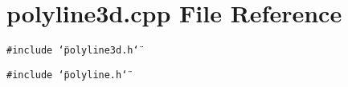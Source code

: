 \section{polyline3d.cpp File Reference}
\label{polyline3d_8cpp}
{\tt \#include \char`\"{}polyline3d.h\char`\"{}}\par
{\tt \#include \char`\"{}polyline.h\char`\"{}}\par
